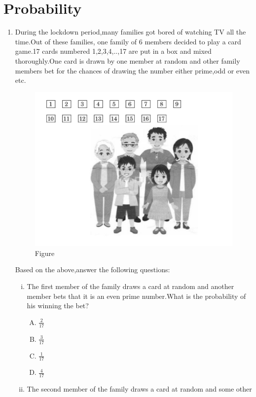 \documentclass{article}
\begin{document}
\section*{\center Probability}
\begin{enumerate}
	\item During the lockdown period,many families got bored of watching TV all the time.Out of these families, one family of 6 members decided to play a card game.17 cards numbered 1,2,3,4,..,17 are put in a box and mixed thoroughly.One card is drawn by one member at random and other family members bet for the chances of drawing the number either prime,odd or even etc.

\begin{figure}[h]
\centering
    \includegraphics[width=\columnwidth]{figs/fig.png}
    \caption{Figure}
    \label{fig:Figure}
\end{figure}
Based on the above,answer the following questions:
\begin{enumerate}[(i)]
	\item The first member of the family draws a card at random and another member bets that it is an even prime number.What is the probability of his winning the bet?
\begin{enumerate}[(A)]
	\item $\frac{2}{17}$
	\item $\frac{3}{17}$
        \item $\frac{1}{17}$
        \item $\frac{4}{17}$
\end{enumerate}
       \item The second member of the family draws a card at random and some other 

\end{enumerate}
\end{enumerate}
\end{document}
